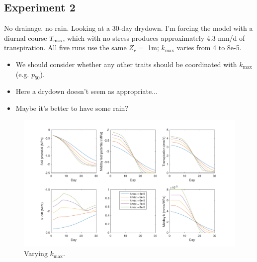 \documentclass[11pt]{article}
\begin{document}
\clearpage
\subsection{Experiment 2}
No drainage, no rain. Looking at a 30-day drydown. I'm forcing the model with a diurnal course $T_\text{max}$, which with no stress produces approximately 4.3 mm/d of transpiration. All five runs use the same $Z_r=$ 1m; $k_\text{max}$ varies from 4 to 8e-5.

\begin{itemize}
\item We should consider whether any other traits should be coordinated with $k_\text{max}$ (e.g. $p_{50}$).
\item Here a drydown doesn't seem as appropriate...
\item Maybe it's better to have some rain?
\end{itemize}


\begin{figure}[h]
\centering
\includegraphics[width=35pc]{../figs/exp2}
\caption{Varying $k_\text{max}$.}
\label{fig:exp2}
\end{figure}





\clearpage

\nocite{*}


\end{document}
